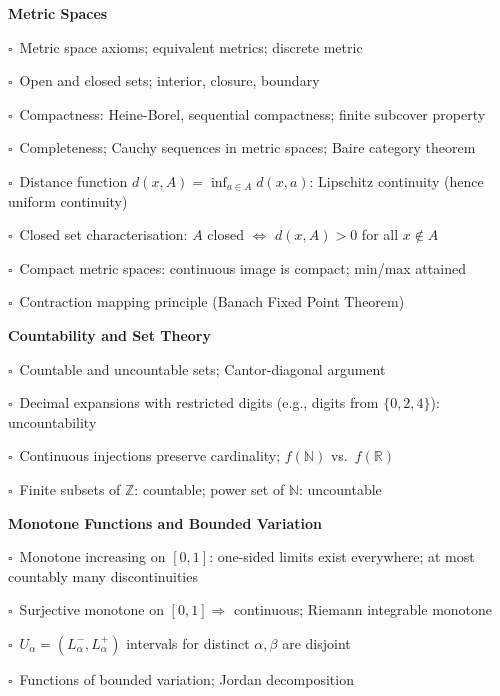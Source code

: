 \documentclass[11pt,a4paper]{article}
\newcommand{\chk}{\textcolor{rulegray}{$\square$}\ }
\begin{document}
\begin{subtopics}
  \item \textbf{Metric Spaces}
  \begin{subtopics}
    \item \chk Metric space axioms; equivalent metrics; discrete metric
    \item \chk Open and closed sets; interior, closure, boundary
    \item \chk Compactness: Heine-Borel, sequential compactness; finite subcover property
    \item \chk Completeness; Cauchy sequences in metric spaces; Baire category theorem
    \item \chk Distance function $d(x,A) = \inf_{a \in A} d(x,a)$: Lipschitz continuity (hence uniform continuity)
    \item \chk Closed set characterisation: $A$ closed $\Leftrightarrow$ $d(x,A)>0$ for all $x \notin A$
    \item \chk Compact metric spaces: continuous image is compact; min/max attained
    \item \chk Contraction mapping principle (Banach Fixed Point Theorem)
  \end{subtopics}

  \item \textbf{Countability and Set Theory}
  \begin{subtopics}
    \item \chk Countable and uncountable sets; Cantor-diagonal argument
    \item \chk Decimal expansions with restricted digits (e.g., digits from $\{0,2,4\}$): uncountability
    \item \chk Continuous injections preserve cardinality; $f(\mathbb{N})$ vs.\ $f(\mathbb{R})$
    \item \chk Finite subsets of $\mathbb{Z}$: countable; power set of $\mathbb{N}$: uncountable
  \end{subtopics}

  \item \textbf{Monotone Functions and Bounded Variation}
  \begin{subtopics}
    \item \chk Monotone increasing on $[0,1]$: one-sided limits exist everywhere; at most countably many discontinuities
    \item \chk Surjective monotone on $[0,1] \Rightarrow$ continuous; Riemann integrable monotone
    \item \chk $U_\alpha=(L_\alpha^-, L_\alpha^+)$ intervals for distinct $\alpha, \beta$ are disjoint
    \item \chk Functions of bounded variation; Jordan decomposition
  \end{subtopics}

\end{subtopics}
\end{document}
